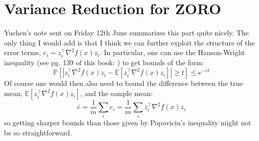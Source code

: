 \documentclass{article}
\begin{document}
\section{Variance Reduction for ZORO}

Yuchen's note sent on Friday 12th June summarizes this part quite nicely. The only thing I would add is that I think we can further exploit the structure of the error terms, $e_i = z_i^{\top}\nabla^{2}f(x)z_i$. In particular, one can use the Hanson-Wright inequality (see pg. 139 of this book: \cite{vershynin2018high}) to get bounds of the form:
$$
\mathbb{P}\left[\left| z_i^{\top}\nabla^{2}f(x)z_i - \mathbb{E}\left[z_i^{\top}\nabla^{2}f(x)z_i\right]\right| \geq t \right] \leq e^{-ct} 
$$
Of course one would then also need to bound the difference between the true mean, $\mathbb{E}\left[z_i^{\top}\nabla^{2}f(x)z_i\right]$, and the sample mean:
$$
\bar{e} = \frac{1}{m}\sum_i e_i = \frac{1}{m} \sum_i z_i^{\top}\nabla^{2}f(x)z_i 
$$
so getting sharper bounds than those given by Popoviciu's inequality might not be so straightforward.


\end{document}
